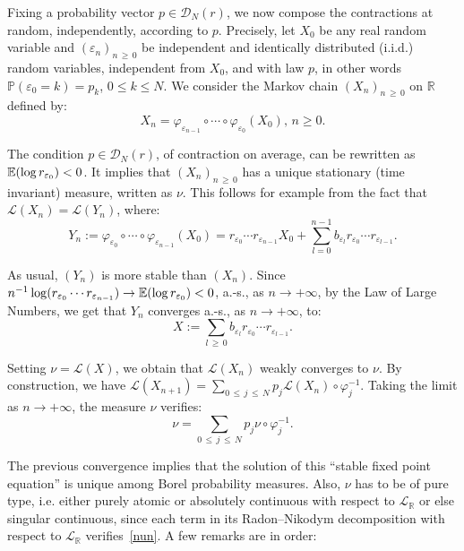 \documentclass[AHL,Unicode,longabstracts,published]{cedram}
\newcommand{\Pbb}{\mathbb P}
\newcommand{\Ebb}{\mathbb E}
\newcommand{\Rbb}{\mathbb R}
\newcommand{\Lcl}{\mathcal{L}}
\newcommand{\Dcl}{\mathcal{D}}
\begin{document}
Fixing a probability vector $p\in{\Dcl}_N(r)$, we now compose the contractions at random, independently, according to $p$. Precisely, let $X_0$ be any real random variable and $(\varepsilon_n)_{n\,\geq\,0}$ be independent and identically distributed (i.i.d.) random variables, independent from $X_0$, and with law $p$, in other words $\Pbb(\varepsilon_0=k)=p_k$, $0\leq k\leq N$. We consider the Markov chain $(X_n)_{n\,\geq\,0}$ on $\Rbb$ defined by:
\[
X_{n}=\varphi_{\varepsilon_{n-1}}\circ \cdots \circ\varphi_{\varepsilon_{0}}(X_{0}),\,n\geq0.
\]


The condition $p\in{\Dcl}_N(r)$, of contraction on average, can be rewritten as $\Ebb(\log r_{\varepsilon_0})\linebreak<0$. It implies that $(X_n)_{n\,\geq\,0}$ has a unique stationary (time invariant) measure, written as $\nu$. This follows for example from the fact that ${\Lcl}(X_n)={\Lcl}(Y_n)$, where:
\[
Y_n:=\varphi_{\varepsilon_{0}}\circ \cdots \circ\varphi_{\varepsilon_{n-1}}(X_0)=r_{\varepsilon_{0}}\cdots r_{ \varepsilon_{n-1}}X_0+\sum_{l=0}^{n-1}b_{\varepsilon_l}r_{\varepsilon_{0}}\cdots r_{\varepsilon_{l-1}}.
\]

As usual, $(Y_n)$ is more stable than $(X_n)$. Since $n^{-1}\log(r_{\varepsilon_0}\cdots r_{\varepsilon_{n-1}})\rightarrow\Ebb(\log r_{\varepsilon_0})\linebreak<0$, a.-s., as $n\rightarrow+\infty$, by the Law of Large Numbers, we get that $Y_n$ converges a.-s., as $n\rightarrow+\infty$, to:
\[
X:=\sum_{l\,\geq\,0}b_{\varepsilon_l}r_{\varepsilon_0}\cdots r_{\varepsilon_{l-1}}.
\]


Setting $\nu={\Lcl}(X)$, we obtain that ${\Lcl}(X_n)$ weakly converges to $\nu$. By construction, we have ${\Lcl}(X_{n+1})=\sum_{0\,\leq\,j\,\leq\,N}p_j{\Lcl}(X_n)\circ \varphi_j^{-1}$. Taking the limit as $n\rightarrow+\infty$, the measure $\nu$ verifies:
\begin{equation}\label{nun}
\nu=\sum_{0\,\leq\,j\,\leq\,N}p_j\nu\circ \varphi_j^{-1}.
\end{equation}

The previous convergence implies that the solution of this ``stable fixed point equation'' is unique among Borel probability measures. Also, $\nu$ has to be of pure type, i.e. either purely atomic or absolutely continuous with respect to ${\Lcl}_{\Rbb}$ or else singular continuous, since each term in its Radon--Nikodym decomposition with respect to ${\Lcl}_{\Rbb}$ verifies~\eqref{nun}. A few remarks are in order:
\end{document}
